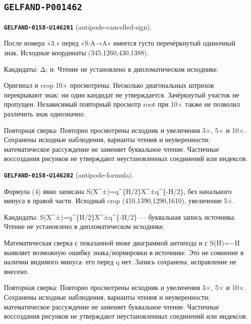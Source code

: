 \subsection*{\texttt{GELFAND-P001462}}
\par\noindent\leavevmode{}\label{GELFAND-0158-U146201}\label{GELFAND-P001462:antipode-cancelled-sign}\textbf{\texttt{GELFAND-0158-U146201}} (antipode-cancelled-sign).\nopagebreak[4]\par
После номера «3.» перед «S:A→A» имеется густо перечёркнутый одиночный знак. Исходные координаты (345,1260,430,1388).\par
Кандидаты: Δ; и. Чтение не установлено в дипломатическом исходнике.\par
Оригинал и crop 10× просмотрены. Несколько диагональных штрихов перекрывают знак; ни один кандидат не утверждается. Зачёркнутый участок не пропущен. Независимый повторный просмотр root при 10× также не позволил различить знак однозначно.\par
Повторная сверка: Повторно просмотрены исходник и увеличения 3×, 5× и 10×. Сохранены исходные наблюдения, варианты чтения и неуверенности; математическое рассуждение не заменяет буквальное чтение. Частичные воссоздания рисунков не утверждают неустановленных соединений или индексов.\par\medskip
\par\noindent\leavevmode{}\label{GELFAND-0158-U146202}\label{GELFAND-P001462:antipode-formula}\textbf{\texttt{GELFAND-0158-U146202}} (antipode-formula).\nopagebreak[4]\par
Формула (4) явно записана S(X\textasciicircum{}±)=q\textasciicircum{}\{H/2\}X\textasciicircum{}±q\textasciicircum{}\{-H/2\}, без начального минуса в правой части. Исходный crop (410,1390,1290,1610), увеличение 5×.\par
Кандидаты: S(X\textasciicircum{}±)=q\textasciicircum{}\{H/2\}X\textasciicircum{}±q\textasciicircum{}\{-H/2\} — буквальная запись источника. Чтение не установлено в дипломатическом исходнике.\par
Математическая сверка с показанной ниже диаграммой антипода и с S(H)=−H выявляет возможную ошибку знака/нормировки в источнике. Это не сомнение в наличии видимого минуса: его перед q нет. Запись сохранена, исправление не внесено.\par
Повторная сверка: Повторно просмотрены исходник и увеличения 3×, 5× и 10×. Сохранены исходные наблюдения, варианты чтения и неуверенности; математическое рассуждение не заменяет буквальное чтение. Частичные воссоздания рисунков не утверждают неустановленных соединений или индексов.\par\medskip

